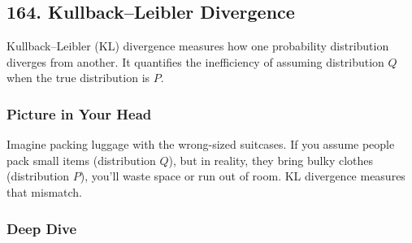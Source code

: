 \documentclass[
  letterpaper,
  DIV=11,
  numbers=noendperiod]{scrreprt}
\begin{document}
\subsection{164. Kullback--Leibler
Divergence}\label{kullbackleibler-divergence}

Kullback--Leibler (KL) divergence measures how one probability
distribution diverges from another. It quantifies the inefficiency of
assuming distribution \(Q\) when the true distribution is \(P\).

\subsubsection{Picture in Your Head}\label{picture-in-your-head-163}

Imagine packing luggage with the wrong-sized suitcases. If you assume
people pack small items (distribution \(Q\)), but in reality, they bring
bulky clothes (distribution \(P\)), you'll waste space or run out of
room. KL divergence measures that mismatch.

\subsubsection{Deep Dive}\label{deep-dive-163}
\end{document}
